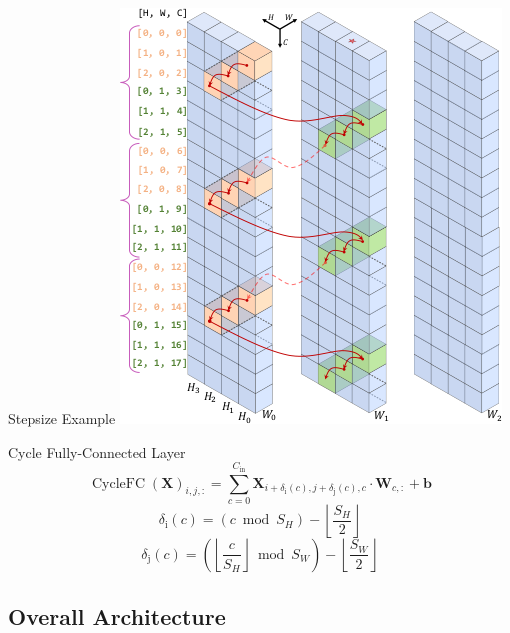\documentclass{beamer}
\DeclareMathOperator{\cyclefc}{CycleFC}
\begin{document}
\begin{frame}{Stepsize Example}
    \centering
    \includegraphics[height=.8\textheight]{figures/stepsize_3_2.png}
\end{frame}

\begin{frame}{Cycle Fully-Connected Layer}
    $$\cyclefc(\mathbf{X})_{i,j,:} = \sum_{c=0}^{C_\text{in}} \mathbf{X}_{i+\delta_\text{i}(c),j+\delta_\text{j}(c),c} \cdot \mathbf{W}_{c,:} + \mathbf{b}$$
    $$\delta_\text{i}(c) = (c \bmod S_H) - \left\lfloor \frac{S_H}{2} \right\rfloor$$
    $$\delta_\text{j}(c) = \left(\left\lfloor \frac{c}{S_H} \right\rfloor \bmod S_W\right) - \left\lfloor \frac{S_W}{2} \right\rfloor$$
\end{frame}

\subsection{Overall Architecture}
\end{document}
